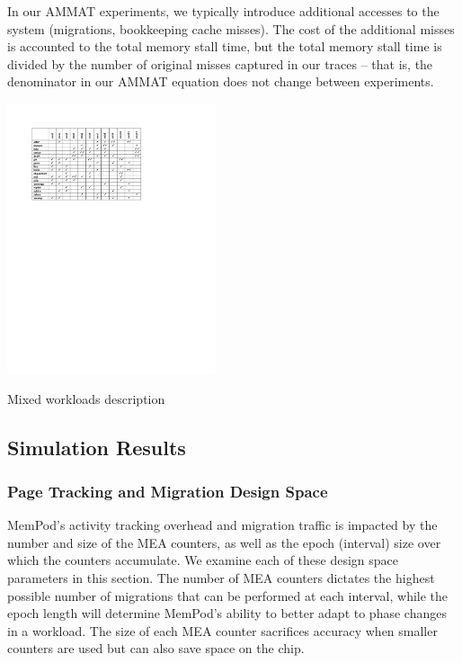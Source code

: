 In our AMMAT experiments, we typically introduce additional accesses to the
system (migrations, bookkeeping cache misses).  The cost of the additional
misses is accounted to the total memory stall time, but the total memory 
stall time is divided by the number of original misses captured in our traces
-- that is, the denominator in our AMMAT equation does not change between
experiments.
\begin{table}
  \includegraphics[width=0.46\textwidth]{figures/workloads_checkmarks.pdf}
  \caption{Mixed workloads description}
  \label{tab:workloads}
\end{table}

\subsection{Simulation Results}
\label{sub:SimResults}

\subsubsection{Page Tracking and Migration Design Space}

MemPod's activity tracking overhead and migration traffic is impacted by
the number and size of the MEA counters, as well as the epoch (interval) 
size over
which the counters accumulate.  We examine each of these design space
parameters in this section.
The number of MEA counters dictates the highest possible number of 
migrations that can be performed at each interval, while the epoch length will determine MemPod's ability to better adapt to phase changes in a workload. The size of each MEA counter sacrifices accuracy when smaller counters are used 
but can also save space on the chip.


